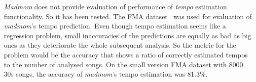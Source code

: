 \textit{Madmom} does not provide evaluation of performance of \textit{tempo} estimation functionality. So it has been
tested. The \ac{FMA} dataset~\cite{fma_dataset} was used for evaluation of \textit{madmom}'s tempo prediction. Even
though tempo estimation seems like a regression problem, small inaccuracies of the predictions are equally as bad as
big ones as they deteriorate the whole subsequent analysis. So the metric for the problem would be the accuracy that
shows a ratio of correctly estimated tempos to the number of analysed songs. On the small version \ac{FMA} dataset with
8000 30s songs, the accuracy of \textit{madmom}'s tempo estimation was 81.3\%.